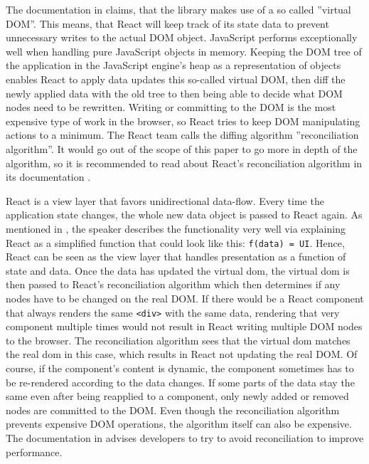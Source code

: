 The documentation in \cite[/docs]{React} claims, that the library makes use of a so called ''virtual DOM''. This means, that React will keep track of its state data to prevent unnecessary writes to the actual DOM object. JavaScript performs exceptionally well when handling pure JavaScript objects in memory. Keeping the DOM tree of the application in the JavaScript engine's heap as a representation of objects enables React to apply data updates this so-called virtual DOM, then diff the newly applied data with the old tree to then being able to decide what DOM nodes need to be rewritten. Writing or committing to the DOM is the most expensive type of work in the browser, so React tries to keep DOM manipulating actions to a minimum. The React team calls the diffing algorithm ''reconciliation algorithm''. It would go out of the scope of this paper to go more in depth of the algorithm, so it is recommended to read about React's reconciliation algorithm in its documentation \cite[/docs]{React}.

React is a view layer that favors unidirectional data-flow. Every time the application state changes, the whole new data object is passed to React again. As mentioned in \cite[6:50]{ReactFoundingVideo}, the speaker describes the functionality very well via explaining React as a simplified function that could look like this: \texttt{f(data) = UI}. Hence, React can be seen as the view layer that handles presentation as a function of state and data. Once the data has updated the virtual dom, the virtual dom is then passed to React's reconciliation algorithm which then determines if any nodes have to be changed on the real DOM. If there would be a React component that always renders the same \texttt{<div>} with the same data, rendering that very component multiple times would not result in React writing multiple DOM nodes to the browser. The reconciliation algorithm sees that the virtual dom matches the real dom in this case, which results in React not updating the real DOM. Of course, if the component's content is dynamic, the component sometimes has to be re-rendered according to the data changes. If some parts of the data stay the same even after being reapplied to a component, only newly added or removed nodes are committed to the DOM. Even though the reconciliation algorithm prevents expensive DOM operations, the algorithm itself can also be expensive. The documentation in \cite[/docs/optimizing-performance.html\#avoid-reconciliation]{React} advises developers to try to avoid reconciliation to improve performance.

